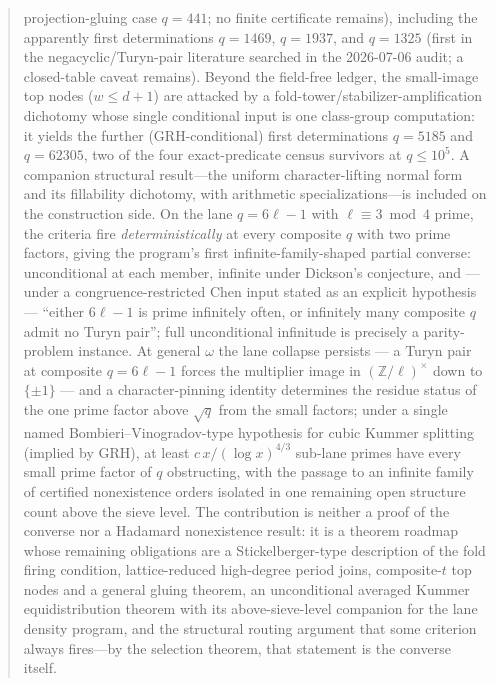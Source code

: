 \documentclass[11pt]{article}
\theoremstyle{plain}
\theoremstyle{definition}
\theoremstyle{remark}
\newcommand{\Z}{\mathbb Z}
\begin{document}
\begin{abstract}
projection-gluing case $q=441$; no finite certificate remains),
including the apparently first determinations $q=1469$, $q=1937$, and
$q=1325$ (first in the negacyclic/Turyn-pair literature searched in the
2026-07-06 audit; a closed-table caveat remains).
Beyond the field-free ledger, the small-image top nodes ($w\le d+1$)
are attacked by a fold-tower/stabilizer-amplification dichotomy whose
single conditional input is one class-group computation: it yields the
further (GRH-conditional) first determinations $q=5185$ and $q=62305$,
two of the four exact-predicate census survivors at $q\le10^5$.  A
companion structural result---the uniform character-lifting normal form
and its fillability dichotomy, with arithmetic specializations---is
included on the construction side. On the lane $q=6\ell-1$ with
$\ell\equiv3\bmod4$ prime, the criteria fire \emph{deterministically}
at every composite $q$ with two prime factors, giving the program's
first infinite-family-shaped partial converse: unconditional at each
member, infinite under Dickson's conjecture, and --- under a
congruence-restricted Chen input stated as an explicit hypothesis ---
``either $6\ell-1$ is prime infinitely often, or infinitely many
composite $q$ admit no Turyn pair''; full unconditional infinitude is
precisely a parity-problem instance. At general $\omega$ the lane
collapse persists --- a Turyn pair at composite $q=6\ell-1$ forces the
multiplier image in $(\Z/\ell)^\times$ down to $\{\pm1\}$ --- and a
character-pinning identity determines the residue status of the one
prime factor above $\sqrt q$ from the small factors; under a single
named Bombieri--Vinogradov-type hypothesis for cubic Kummer splitting
(implied by GRH), at least $c\,x/(\log x)^{4/3}$ sub-lane primes have
every small prime factor of $q$ obstructing, with the passage to an
infinite family of certified nonexistence orders isolated in one
remaining open structure count above the sieve level. The contribution is neither a proof
of the converse nor a Hadamard nonexistence result: it is a theorem
roadmap whose remaining obligations are a Stickelberger-type
description of the fold firing condition, lattice-reduced high-degree
period joins, composite-$t$ top nodes and a general gluing theorem, an
unconditional averaged Kummer equidistribution theorem with its
above-sieve-level companion for the lane density program, and
the structural routing argument that some criterion always fires---by
the selection theorem, that statement is the converse itself.
\end{abstract}
\end{document}
